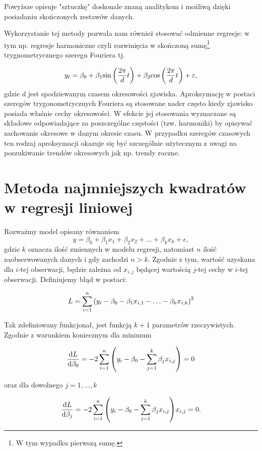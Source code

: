 \documentclass[10pt,a4paper]{book}
\begin{document}
Powyższe opisuje "sztuczkę" doskonale znaną analitykom i możliwą dzięki posiadaniu skończonych zestawów danych.

Wykorzystanie tej metody pozwala nam również stosować odmienne regresje: w tym np. regresje harmoniczne czyli rozwinięcia w skończoną sumę\footnote{W tym wypadku pierwszą sumę.} trygnometrycznego szeregu Fouriera tj.

\begin{equation}
y_t = \beta_0 + \beta_1 {{\sin}\left( {\frac{2 \pi}{d} t} \right)}  + \beta_2 {{\cos}\left( {\frac{2 \pi}{d} t} \right)} + \varepsilon,
\end{equation}
gdzie $d$ jest spodziewanym czasem okresowości zjawiska. Aproksymację w postaci szeregów trygonometrycznych Fouriera są stosowane nader często kiedy zjawisko posiada właśnie cechy okresowości. W efekcie jej stosowania wyznaczane są składowe odpowiadające za poszczególne częstości (tzw. harmoniki) by opisywać zachowanie okresowe w danym okresie czasu. W przypadku szeregów czasowych ten rodzaj aproksymacji okazuje się być szczególnie użytecznym z uwagi na poszukiwanie trendów okresowych jak np. trendy roczne.

\section{Metoda najmniejszych kwadratów w regresji liniowej}

Rozważmy model opisany równaniem 
$$
y = \beta_0 + \beta_1 x_1 + \beta_2 x_2 + \ldots + \beta_k x_k + \epsilon,
$$
gdzie $k$ oznacza ilość zmiennych w modelu regresji, natomiast $n$ ilość zaobserwowanych danych i gdy zachodzi $n > k$. Zgodnie z tym, wartość uzyskana dla $i$-tej obserwacji, będzie zależna od $x_{i,j}$ będącej wartością $j$-tej cechy w $i$-tej obserwacji. Definiujemy błąd w postaci:

$$
L = \sum_{i=1}^{n} \bracket{y_i - \beta_0 - \beta_1 x_{i,1} - \ldots - \beta_k x_{i,k}}^2
$$

Tak zdefiniowany funkcjonał, jest funkcją $k+1$ parametrów rzeczywistych. Zgodnie z warunkiem koniecznym dla minimum

$$
\ddx[{L}]{\beta_0} = -2 \sum_{i=1}^{n} \bracket{y_i - \beta_0 - \sum_{j=1}^{k} \beta_j x_{i,j}} = 0
$$

oraz dla dowolnego $j = 1, \ldots, k$

$$
\ddx[{L}]{\beta_j} = -2 \sum_{i=1}^{n} \bracket{y_i - \beta_0 - \sum_{j=1}^{k} \beta_j x_{i,j}} x_{i,j} = 0 .
$$
\end{document}

